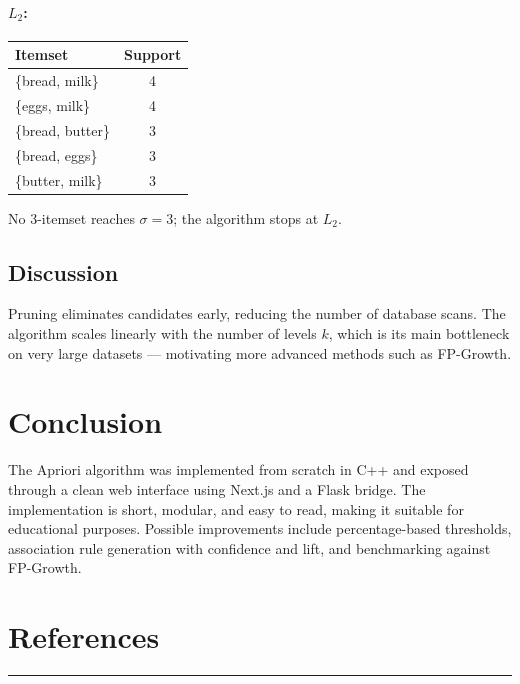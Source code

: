 \documentclass[11pt,a4paper]{article}
\begin{document}
\paragraph{$L_2$:}
\begin{center}
\begin{tabular}{|l|c|}
\hline
\textbf{Itemset} & \textbf{Support} \\
\hline
\{bread, milk\}   & 4 \\
\{eggs, milk\}    & 4 \\
\{bread, butter\} & 3 \\
\{bread, eggs\}   & 3 \\
\{butter, milk\}  & 3 \\
\hline
\end{tabular}
\end{center}

No 3-itemset reaches $\sigma = 3$; the algorithm stops at $L_2$.

\subsection{Discussion}
Pruning eliminates candidates early, reducing the number of database
scans. The algorithm scales linearly with the number of levels $k$, which
is its main bottleneck on very large datasets — motivating more advanced
methods such as FP-Growth.

\section{Conclusion}

The Apriori algorithm was implemented from scratch in C++ and exposed
through a clean web interface using Next.js and a Flask bridge. The
implementation is short, modular, and easy to read, making it suitable for
educational purposes. Possible improvements include percentage-based
thresholds, association rule generation with confidence and lift, and
benchmarking against FP-Growth.

\section*{\color{DelftBlue}References}
\vspace{-6pt}\textcolor{EarthYellow}{\rule{\linewidth}{1pt}}\vspace{6pt}
\end{document}
